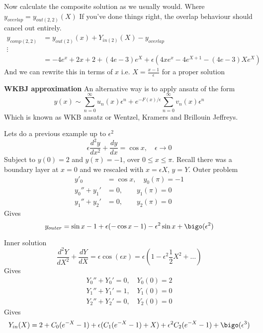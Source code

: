 \documentclass{/home/janmebows/Documents/LatexTemplates/myassignment}
\begin{document}
Now calculate the composite solution as we usually would. Where $y_{overlap} = y_{out(2,2)}(X)$
If you've done things right, the overlap behaviour should cancel out entirely.
\begin{align*}
    y_{comp(2,2)} &= y_{out(2)}(x) + Y_{in(2)}(X) - y_{overlap}\\
    \vdots&\\
    &= -4e^x + 2x + 2 + (4e-3)e^X + \epsilon\left(4xe^x - 4e^{X+1} - (4e-3) Xe^X\right)
\end{align*}
And we can rewrite this in terms of $x$ i.e. $X = \frac{x-1}{\epsilon}$ for a proper solution


\textbf{WKBJ approximation}
An alternative way is to apply ansatz of the form
\[y(x) \sim \sum_{n=0}^\infty u_n(x) \epsilon^n + e^{-F(x)/\epsilon} \sum_{n=0}^\infty v_n(x) \epsilon^n\]
Which is known as WKB ansatz or Wentzel, Kramers and Brillouin Jeffreys. 




Lets do a previous example up to $\epsilon^2$
\[\epsilon \frac{d^2y}{dx^2} + \frac{dy}{dx} = \cos x,\quad \epsilon\to 0\]
Subject to $y(0) = 2$ and $y(\pi) = -1$, over $0\leq x \leq \pi$. Recall there was a boundary layer at $x=0$ and we rescaled with $x=\epsilon X$, $y=Y$.
Outer problem
\begin{align*}
    y'_0 &= \cos x,\quad  y_0(\pi) = -1\\
    y_0'' + y_1' &= 0 ,\qquad  y_1(\pi) = 0\\
    y_1'' + y_2' &= 0,\qquad y_2(\pi) =0
\end{align*}
Gives
\[y_{outer} = \sin x -1 + \epsilon(-\cos x - 1) - \epsilon^2 \sin x + \bigo(\epsilon^2)\]



Inner solution  
\[\frac{d^2Y}{dX^2} + \frac{dY}{dX} = \epsilon \cos(\epsilon x) = \epsilon\left(1 - \epsilon^2 \frac12 X^2 + \hdots\right)\]
Gives
\begin{align*}
    Y_0'' + Y_0' = 0,\quad Y_0(0)=2\\
    Y_1'' + Y_1' =1,\quad Y_1(0)=0\\
    Y_2'' + Y_2' = 0,\quad Y_2(0)=0
\end{align*}
Gives
\[Y_{in}(X) = 2 + C_0 (e^{-X} - 1) + \epsilon (C_1 (e^{-X} -1) + X) + \epsilon^2 C_2(e^{-X} -1) + \bigo(\epsilon^3)\]
\end{document}
